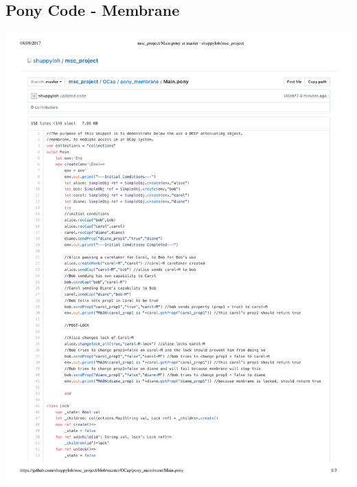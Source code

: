 \documentclass[a4paper,11pt,twoside]{article}
\begin{document}
{\subsection{Pony Code - Membrane}\label{sec:code_Membrane}
\begin{minipage}{\textwidth}
\includegraphics[width=\textwidth,valign=t,page=1]{figures/code_Membrane.pdf}
\end{minipage}\clearpage
\begin{minipage}{\textwidth}

\end{minipage}}
\end{document}
